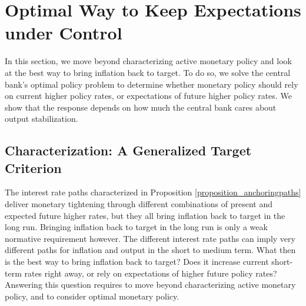 \documentclass{article}
\begin{document}
\section{Optimal Way to Keep Expectations under Control}\label{sec_optimal}
In this section, we move beyond characterizing active monetary policy and look at the best way to bring inflation back to target. To do so, we solve the central bank's optimal policy problem to determine whether monetary policy should rely on current higher policy rates, or expectations of future higher policy rates. We show that the response depends on how much the central bank cares about output stabilization.

\subsection{Characterization: A Generalized Target Criterion}
The interest rate paths characterized in Proposition \ref{proposition_anchoringpaths} deliver monetary tightening through different combinations of present and expected future higher rates, but they all bring inflation back to target in the long run. Bringing inflation back to target in the long run is only a weak normative requirement however. The different interest rate paths can imply very different paths for inflation and output in the short to medium term. What then is the best way to bring inflation back to target? Does it increase current short-term rates right away, or rely on expectations of higher future policy rates? Answering this question requires to move beyond characterizing active monetary policy, and to consider optimal monetary policy.
\end{document}
